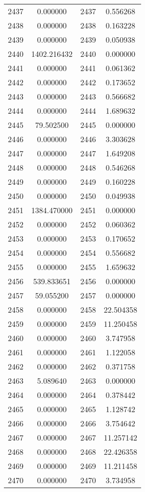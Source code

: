 \documentclass[12pt]{article}
\begin{document}
\begin{longtable}{@{}cccc@{}}
2437 & 0.000000 & 2437 & 0.556268 \\
2438 & 0.000000 & 2438 & 0.163228 \\
2439 & 0.000000 & 2439 & 0.050938 \\
2440 & 1402.216432 & 2440 & 0.000000 \\
2441 & 0.000000 & 2441 & 0.061362 \\
2442 & 0.000000 & 2442 & 0.173652 \\
2443 & 0.000000 & 2443 & 0.566682 \\
2444 & 0.000000 & 2444 & 1.689632 \\
2445 & 79.502500 & 2445 & 0.000000 \\
2446 & 0.000000 & 2446 & 3.303628 \\
2447 & 0.000000 & 2447 & 1.649208 \\
2448 & 0.000000 & 2448 & 0.546268 \\
2449 & 0.000000 & 2449 & 0.160228 \\
2450 & 0.000000 & 2450 & 0.049938 \\
2451 & 1384.470000 & 2451 & 0.000000 \\
2452 & 0.000000 & 2452 & 0.060362 \\
2453 & 0.000000 & 2453 & 0.170652 \\
2454 & 0.000000 & 2454 & 0.556682 \\
2455 & 0.000000 & 2455 & 1.659632 \\
2456 & 539.833651 & 2456 & 0.000000 \\
2457 & 59.055200 & 2457 & 0.000000 \\
2458 & 0.000000 & 2458 & 22.504358 \\
2459 & 0.000000 & 2459 & 11.250458 \\
2460 & 0.000000 & 2460 & 3.747958 \\
2461 & 0.000000 & 2461 & 1.122058 \\
2462 & 0.000000 & 2462 & 0.371758 \\
2463 & 5.089640 & 2463 & 0.000000 \\
2464 & 0.000000 & 2464 & 0.378442 \\
2465 & 0.000000 & 2465 & 1.128742 \\
2466 & 0.000000 & 2466 & 3.754642 \\
2467 & 0.000000 & 2467 & 11.257142 \\
2468 & 0.000000 & 2468 & 22.426358 \\
2469 & 0.000000 & 2469 & 11.211458 \\
2470 & 0.000000 & 2470 & 3.734958 \\

\end{longtable}
\end{document}
